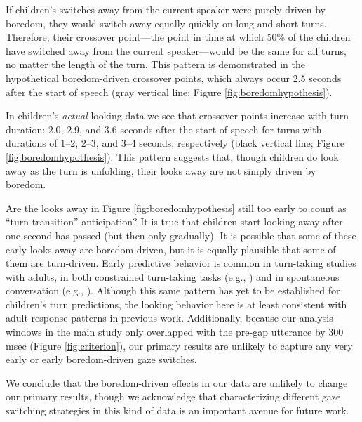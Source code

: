 \documentclass[authoryear, 12pt]{elsarticle}
\begin{document}
If children's switches away from the current speaker were purely driven by boredom, they would switch away equally quickly on long and short turns. Therefore, their crossover point---the point in time at which 50\% of the children have switched away from the current speaker---would be the same for all turns, no matter the length of the turn. This pattern is demonstrated in the hypothetical boredom-driven crossover points, which always occur 2.5 seconds after the start of speech (gray vertical line; Figure \ref{fig:boredomhypothesis}). 

In children's \textit{actual} looking data we see that crossover points increase with turn duration: 2.0, 2.9, and 3.6 seconds after the start of speech for turns with durations of 1--2, 2--3, and 3--4 seconds, respectively (black vertical line; Figure \ref{fig:boredomhypothesis}). This pattern suggests that, though children do look away as the turn is unfolding, their looks away are not simply driven by boredom.

Are the looks away in Figure \ref{fig:boredomhypothesis} still too early to count as ``turn-transition'' anticipation? It is true that children start looking away after one second has passed (but then only gradually). It is possible that some of these early looks away are boredom-driven, but it is equally plausible that some of them are turn-driven. Early predictive behavior is common in turn-taking studies with adults, in both constrained turn-taking tasks (e.g., \citealp{de-ruiter2006, gisladottir2015, bogels2015}) and in spontaneous conversation (e.g., \citealp{holler2015, torreira2015}). Although this same pattern has yet to be established for children's turn predictions, the looking behavior here is at least consistent with adult response patterns in previous work. Additionally, because our analysis windows in the main study only overlapped with the pre-gap utterance by 300 msec (Figure \ref{fig:criterion}), our primary results are unlikely to capture any very early or early boredom-driven gaze switches.

We conclude that the boredom-driven effects in our data are unlikely to change our primary results, though we acknowledge that characterizing different gaze switching strategies in this kind of data is an important avenue for future work. 

\clearpage
\end{document}
